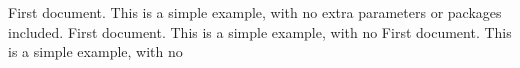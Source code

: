 \documentclass{Report}
\begin{document}
\tableofcontents
First document. This is a simple example, with no 
extra parameters or packages included.
First document. This is a simple example, with no 
First document. This is a simple example, with no 

\pagebreak

\end{document}
